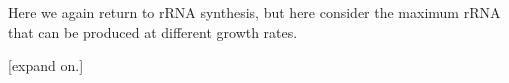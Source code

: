
Here we again return to rRNA synthesis, but here consider the maximum rRNA that can
be produced at different growth rates.

[expand on.]
